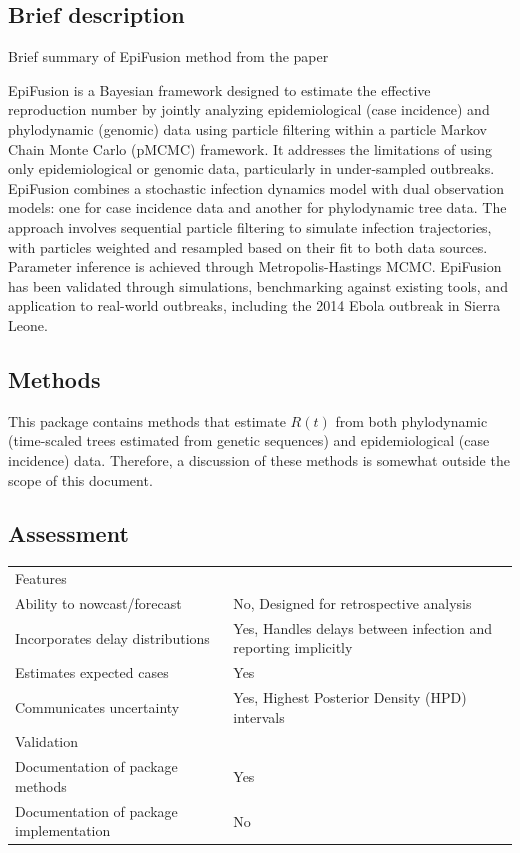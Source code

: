 \documentclass[
  letterpaper,
  DIV=11,
  numbers=noendperiod]{scrreprt}
\begin{document}
\subsection*{Brief description}\label{brief-description-5}

Brief summary of EpiFusion method from the paper

EpiFusion is a Bayesian framework designed to estimate the effective
reproduction number by jointly analyzing epidemiological (case
incidence) and phylodynamic (genomic) data using particle filtering
within a particle Markov Chain Monte Carlo (pMCMC) framework. It
addresses the limitations of using only epidemiological or genomic data,
particularly in under-sampled outbreaks. EpiFusion combines a stochastic
infection dynamics model with dual observation models: one for case
incidence data and another for phylodynamic tree data. The approach
involves sequential particle filtering to simulate infection
trajectories, with particles weighted and resampled based on their fit
to both data sources. Parameter inference is achieved through
Metropolis-Hastings MCMC. EpiFusion has been validated through
simulations, benchmarking against existing tools, and application to
real-world outbreaks, including the 2014 Ebola outbreak in Sierra Leone.

\subsection*{Methods}\label{methods-4}

This package contains methods that estimate \(R(t)\) from both
phylodynamic (time-scaled trees estimated from genetic sequences) and
epidemiological (case incidence) data. Therefore, a discussion of these
methods is somewhat outside the scope of this document.

\subsection*{Assessment}\label{assessment-4}

\begin{longtable}[]{@{}
  >{\raggedright\arraybackslash}p{}
  >{\raggedright\arraybackslash}p{}@{}}
\toprule\noalign{}
\endhead
\bottomrule\noalign{}
\endlastfoot
Features & \\
Ability to nowcast/forecast & No, Designed for retrospective analysis \\
Incorporates delay distributions & Yes, Handles delays between infection
and reporting implicitly \\
Estimates expected cases & Yes \\
Communicates uncertainty & Yes, Highest Posterior Density (HPD)
intervals \\
Validation & \\
Documentation of package methods & Yes \\
Documentation of package implementation & No \\
\end{longtable}
\end{document}
